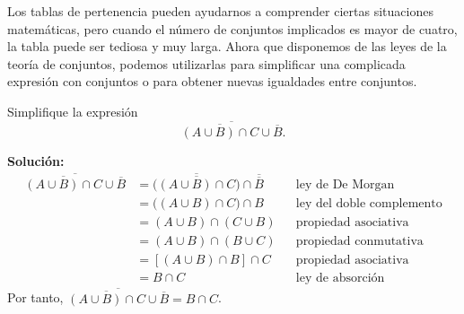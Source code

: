 \begin{BOX}
    Los tablas de pertenencia pueden ayudarnos a comprender ciertas situaciones matemáticas, pero cuando el número de conjuntos implicados es mayor de cuatro, la tabla puede ser tediosa y muy larga. Ahora que disponemos de las leyes de la teoría de conjuntos, podemos utilizarlas para simplificar una complicada expresión con conjuntos o para obtener nuevas igualdades entre conjuntos.
\end{BOX}

\newpage

\begin{myexample}
    Simplifique la expresión
    $$\overline{\overline{(A \cup B) \cap C} \cup \overline{B}}.$$

    \tcblower
    \textbf{\color{jblueleft}Solución:}
    \begin{align*}
        \overline{\overline{(A \cup B) \cap C} \cup \overline{B}} & = \overline{\overline{\big((A \cup B) \cap C \big)}} \cap \overline{\overline{B}} && \text{ley de De Morgan} \\
        & = \big((A \cup B) \cap C \big) \cap B && \text{ley del doble complemento} \\
        & = (A \cup B) \cap (C \cup B) && \text{propiedad asociativa} \\
        & = (A \cup B) \cap (B \cup C) && \text{propiedad conmutativa} \\
        & = [(A \cup B) \cap B] \cap C && \text{propiedad asociativa} \\
        & = B \cap C && \text{ley de absorción}
    \end{align*}
    Por tanto, $\overline{\overline{(A \cup B) \cap C} \cup \overline{B}} = B \cap C$.
\end{myexample}

